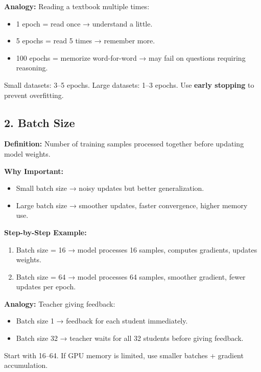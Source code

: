 \documentclass[a4paper, 12pt]{article}
\begin{document}
\textbf{Analogy:} Reading a textbook multiple times:
\begin{itemize}
    \item 1 epoch = read once → understand a little.  
    \item 5 epochs = read 5 times → remember more.  
    \item 100 epochs = memorize word-for-word → may fail on questions requiring reasoning.  
\end{itemize}

\begin{tcolorbox}[colback=orange!5,colframe=orange!70!black,title=Rule of Thumb]
Small datasets: 3--5 epochs.  
Large datasets: 1--3 epochs.  
Use \textbf{early stopping} to prevent overfitting.
\end{tcolorbox}



\subsection*{2. Batch Size}
\textbf{Definition:} Number of training samples processed together before updating model weights.  

\textbf{Why Important:}  
\begin{itemize}
    \item Small batch size → noisy updates but better generalization.  
    \item Large batch size → smoother updates, faster convergence, higher memory use.  
\end{itemize}

\textbf{Step-by-Step Example:}
\begin{enumerate}
    \item Batch size = 16 → model processes 16 samples, computes gradients, updates weights.  
    \item Batch size = 64 → model processes 64 samples, smoother gradient, fewer updates per epoch.  
\end{enumerate}

\textbf{Analogy:} Teacher giving feedback:  
\begin{itemize}
    \item Batch size 1 → feedback for each student immediately.  
    \item Batch size 32 → teacher waits for all 32 students before giving feedback.  
\end{itemize}

\begin{tcolorbox}[colback=green!5,colframe=green!70!black,title=Rule of Thumb]
Start with 16--64.  
If GPU memory is limited, use smaller batches + gradient accumulation.
\end{tcolorbox}
\end{document}
